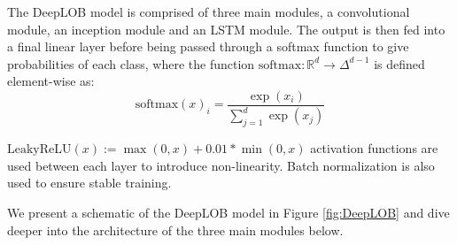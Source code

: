 \documentclass[a4paper, oneside, notitlepage]{book}
\begin{document}
The DeepLOB model is comprised of three main modules, a convolutional module, an inception module and
an LSTM module. The output is then fed into a final linear layer before being passed through a softmax
function to give probabilities of each class, where the function $\text{softmax}: \mathbb{R}^d \to \Delta^{d-1}$
is defined element-wise as:
\begin{equation}
   \text{softmax}(x)_i = \frac{\exp(x_i)}{\sum_{j=1}^{d} \exp(x_j)}
\end{equation}

$\text{LeakyReLU}(x) := \max(0, x) + 0.01 * \min(0, x)$ \cite{MAAS2013} activation functions are used between each layer to introduce non-linearity.
Batch normalization is also used to ensure stable training.

We present a schematic of the DeepLOB model in Figure \ref{fig:DeepLOB} and dive deeper
into the architecture of the three main modules below.

\clearpage
\end{document}
